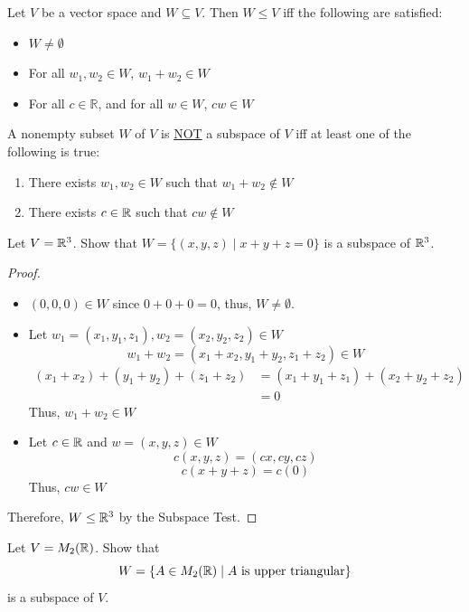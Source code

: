 \begin{theorem}
Let $V$ be a vector space and $W \subseteq V$. Then $W \leq V$ iff the following are satisfied:
\begin{itemize}
    \item $W \neq \emptyset$
    \item For all $w_1, w_2 \in W$, $w_1 + w_2 \in W$
    \item For all $c \in \mathbb{R}$, and for all $w \in W$, $cw \in W$
\end{itemize}
\end{theorem}

\begin{remark}
A nonempty subset $W$ of $V$ is \ul{NOT} a subspace of $V$ iff at least one of the following is true:
\begin{enumerate}
    \item There exists $w_1, w_2 \in W$ such that $w_1 + w_2 \notin W$
    \item There exists $c \in \mathbb{R}$ such that $cw \notin W$
\end{enumerate}
\end{remark}

\begin{example}
Let $V = \mathbb{R}^3$. Show that $W = \{(x, y, z) \mid x + y + z = 0\}$ is a subspace of $\mathbb{R}^3$.
\end{example}

\begin{proof}
\leavevmode
\begin{itemize}
    \item $(0, 0, 0) \in W$ since $0 + 0 + 0 = 0$, thus, $W \neq \emptyset$.
    \item Let $w_1 = (x_1, y_1, z_1), w_2 = (x_2, y_2, z_2) \in W$
    $$w_1 + w_2 = (x_1 + x_2, y_1 + y_2, z_1 + z_2) \in W$$
    \begin{align*}
        (x_1 + x_2) + (y_1 + y_2) + (z_1 + z_2) &= (x_1 + y_1 + z_1) + (x_2 + y_2 + z_2) \\
        &= 0
    \end{align*}
    Thus, $w_1 + w_2 \in W$
    \item Let $c \in \mathbb{R}$ and $w = (x, y, z) \in W$
    $$c(x, y, z) = (cx, cy, cz) $$
    $$c(x + y + z) = c(0)$$
    Thus, $cw \in W$
\end{itemize}
Therefore, $W \leq \mathbb{R}^3$ by the Subspace Test.
\end{proof}

\begin{example}
Let $V = M_2(\mathbb{R})$. Show that 
$$W = \{A \in M_2(\mathbb{R}) \mid A \text{ is upper triangular}\}$$
is a subspace of $V$.
\end{example}

